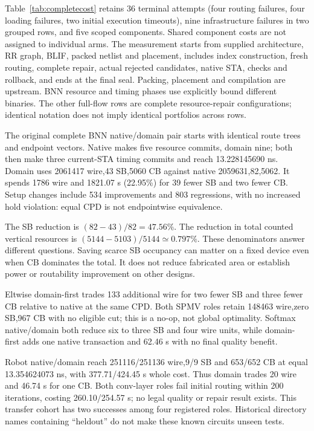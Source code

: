 \documentclass[conference,10pt]{IEEEtran}
\begin{document}
Table~\ref{tab:completecost} retains 36 terminal attempts (four routing failures, four loading failures, two initial execution timeouts), nine infrastructure failures in two grouped rows, and five scoped components. Shared component costs are not assigned to individual arms. The measurement starts from supplied architecture, RR graph, BLIF, packed netlist and placement, includes index construction, fresh routing, complete repair, actual rejected candidates, native STA, checks and rollback, and ends at the final seal. Packing, placement and compilation are upstream. BNN resource and timing phases use explicitly bound different binaries. The other full-flow rows are complete resource-repair configurations; identical notation does not imply identical portfolios across rows.

The original complete BNN native/domain pair starts with identical route trees and endpoint vectors. Native makes five resource commits, domain nine; both then make three current-STA timing commits and reach 13.228145690 ns. Domain uses 2061417 wire,43 SB,5060 CB against native 2059631,82,5062. It spends 1786 wire and 1821.07 s (22.95\%) for 39 fewer SB and two fewer CB. Setup changes include 534 improvements and 803 regressions, with no increased hold violation: equal CPD is not endpointwise equivalence.

The SB reduction is $(82-43)/82=47.56\%$. The reduction in total counted vertical resources is $(5144-5103)/5144\simeq 0.797\%$. These denominators answer different questions. Saving scarce SB occupancy can matter on a fixed device even when CB dominates the total. It does not reduce fabricated area or establish power or routability improvement on other designs.

Eltwise domain-first trades 133 additional wire for two fewer SB and three fewer CB relative to native at the same CPD. Both SPMV roles retain 148463 wire,zero SB,967 CB with no eligible cut; this is a no-op, not global optimality. Softmax native/domain both reduce six to three SB and four wire units, while domain-first adds one native transaction and 62.46 s with no final quality benefit.

Robot native/domain reach 251116/251136 wire,9/9 SB and 653/652 CB at equal 13.354624073 ns, with 377.71/424.45 s whole cost. Thus domain trades 20 wire and 46.74 s for one CB. Both conv-layer roles fail initial routing within 200 iterations, costing 260.10/254.57 s; no legal quality or repair result exists. This transfer cohort has two successes among four registered roles. Historical directory names containing ``heldout'' do not make these known circuits unseen tests.
\end{document}
